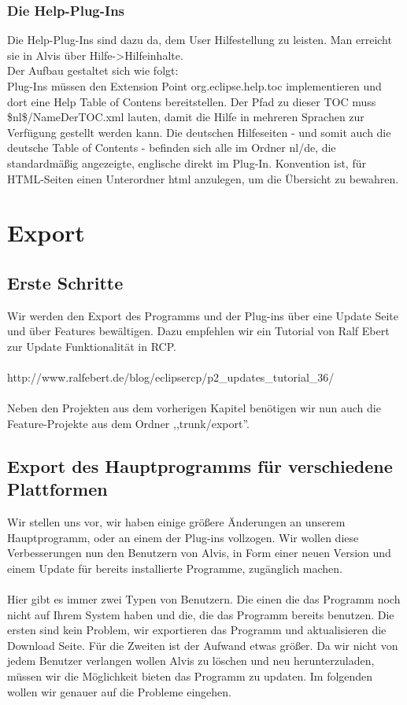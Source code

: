 \documentclass[10pt,a4paper,oneside]{scrbook}
\begin{document}
\subsection{Die Help-Plug-Ins}
Die Help-Plug-Ins sind dazu da, dem User Hilfestellung zu leisten. Man erreicht sie in Alvis über Hilfe->Hilfeinhalte.\\
Der Aufbau gestaltet sich wie folgt:\\
Plug-Ins müssen den Extension Point org.eclipse.help.toc implementieren und dort eine Help Table of Contens bereitstellen.
Der Pfad zu dieser TOC muss \$nl\$/NameDerTOC.xml lauten, damit die Hilfe in mehreren Sprachen zur Verfügung gestellt werden kann.
Die deutschen Hilfeseiten - und somit auch die deutsche Table of Contents - befinden sich alle im Ordner nl/de, die 
standardmäßig angezeigte, englische direkt im Plug-In. Konvention ist, für HTML-Seiten einen Unterordner html anzulegen,
um die Übersicht zu bewahren.

\newpage
\chapter{Export}
\section{Erste Schritte}
Wir werden den Export des Programms und der Plug-ins über eine Update Seite und über Features bewältigen. Dazu empfehlen wir ein Tutorial von Ralf Ebert zur Update Funktionalität in RCP.
\\ \\
http://www.ralfebert.de/blog/eclipsercp/p2\_updates\_tutorial\_36/
\\ \\
Neben den Projekten aus dem vorherigen Kapitel benötigen wir nun auch die Feature-Projekte aus dem Ordner ,,trunk/export''.

\section{Export des Hauptprogramms für verschiedene Plattformen}
Wir stellen uns vor, wir haben einige größere Änderungen an unserem Hauptprogramm, oder an einem der Plug-ins vollzogen. Wir wollen diese Verbesserungen nun den Benutzern von Alvis, in Form einer neuen Version und einem Update für bereits installierte Programme, zugänglich machen. 
\\ \\
Hier gibt es immer zwei Typen von Benutzern. Die einen die das Programm noch nicht auf Ihrem System haben und die, die das Programm bereits benutzen. Die ersten sind kein Problem, wir exportieren das Programm und aktualisieren die Download Seite. Für die Zweiten ist der Aufwand etwas größer. Da wir nicht von jedem Benutzer verlangen wollen Alvis zu löschen und neu herunterzuladen, müssen wir die Möglichkeit bieten das Programm zu updaten. Im folgenden wollen wir genauer auf die Probleme eingehen.
\end{document}
